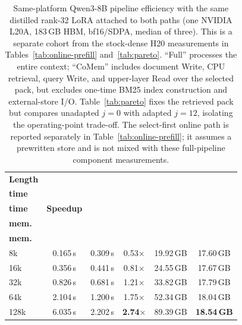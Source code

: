 \begin{table}[!t]
\centering
\footnotesize
\setlength{\tabcolsep}{3.3pt}
\begin{tabular}{@{}lccccc@{}}
\toprule
\textbf{Length} & \shortstack{\textbf{Full}\\\textbf{time}} & \shortstack{\textbf{CoMem}\\\textbf{time}} & \textbf{Speedup} & \shortstack{\textbf{Full}\\\textbf{mem.}} & \shortstack{\textbf{CoMem}\\\textbf{mem.}} \\
\midrule
8k   & 0.165\,s & 0.309\,s & 0.53$\times$ & 19.92\,GB & 17.60\,GB \\
16k  & 0.356\,s & 0.441\,s & 0.81$\times$ & 24.55\,GB & 17.67\,GB \\
32k  & 0.826\,s & 0.681\,s & 1.21$\times$ & 33.82\,GB & 17.79\,GB \\
64k  & 2.104\,s & 1.200\,s & 1.75$\times$ & 52.34\,GB & 18.04\,GB \\
128k & 6.035\,s & 2.202\,s & \textbf{2.74$\times$} & 89.39\,GB & \textbf{18.54\,GB} \\
\bottomrule
\end{tabular}
\caption{Same-platform Qwen3-8B pipeline efficiency with the same distilled rank-32 LoRA
attached to both paths (one NVIDIA L20A, 183\,GB HBM, bf16/SDPA, median of three). This
is a separate cohort from the stock-dense H20 measurements in
Tables~\ref{tab:online-prefill} and~\ref{tab:pareto}. ``Full''
processes the entire context; ``CoMem'' includes document Write, CPU retrieval,
query Write, and upper-layer Read over the selected pack, but excludes one-time
BM25 index construction and external-store I/O. Table~\ref{tab:pareto} fixes the
retrieved pack but compares unadapted $j{=}0$ with adapted $j{=}12$, isolating
the operating-point trade-off. The select-first online path is reported
separately in Table~\ref{tab:online-prefill}; it assumes a prewritten store and
is not mixed with these full-pipeline component measurements.}
\label{tab:eff}
\end{table}
